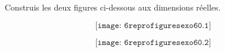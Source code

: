 Construis les deux figures ci-dessous aux dimensions réelles.
\begin{multicols}{2}
\[\texttt{[image: 6reprofiguresexo60.1]}\]
\par
\[\texttt{[image: 6reprofiguresexo60.2]}\]	
\end{multicols}
